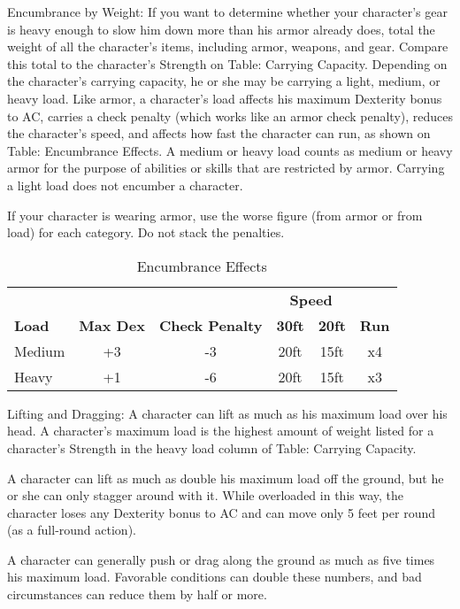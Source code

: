 Encumbrance by Weight: If you want to determine whether your character's gear is heavy enough to slow him down more than his armor already does, total the weight of all the character's items, including armor, weapons, and gear. Compare this total to the character's Strength on Table: Carrying Capacity. Depending on the character's carrying capacity, he or she may be carrying a light, medium, or heavy load. Like armor, a character's load affects his maximum Dexterity bonus to AC, carries a check penalty (which works like an armor check penalty), reduces the character's speed, and affects how fast the character can run, as shown on Table: Encumbrance Effects. A medium or heavy load counts as medium or heavy armor for the purpose of abilities or skills that are restricted by armor. Carrying a light load does not encumber a character.
				
If your character is wearing armor, use the worse figure (from armor or from load) for each category. Do not stack the penalties.



\begin{table}[htb]
\sffamily
{}
\caption{Encumbrance Effects}
\centering
\begin{tabular}{l c c c c c}
              &                  &                        & \multicolumn{2}{c}{\textbf{Speed}}\\
\textbf{Load} & \textbf{Max Dex} & \textbf{Check Penalty} & \textbf{30ft} & \textbf{20ft} & \textbf{Run}\\
Medium & +3 & -3 & 20ft & 15ft & x4\\
Heavy & +1 & -6 & 20ft & 15ft & x3\\
\end{tabular}
\end{table}

				
Lifting and Dragging: A character can lift as much as his maximum load over his head. A character's maximum load is the highest amount of weight listed for a character's Strength in the heavy load column of Table: Carrying Capacity.
				
A character can lift as much as double his maximum load off the ground, but he or she can only stagger around with it. While overloaded in this way, the character loses any Dexterity bonus to AC and can move only 5 feet per round (as a full-round action).
				
A character can generally push or drag along the ground as much as five times his maximum load. Favorable conditions can double these numbers, and bad circumstances can reduce them by half or more.
				
